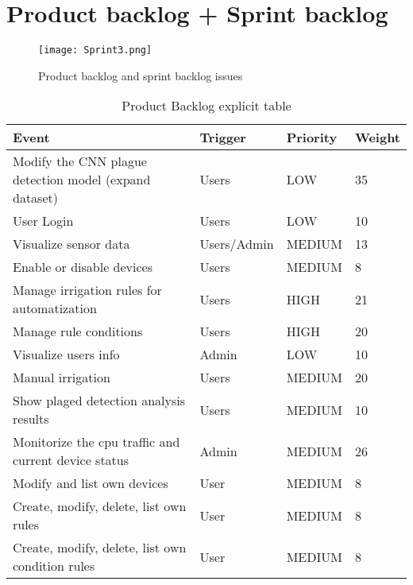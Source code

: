 \documentclass[11pt,a4paper]{article}
\begin{document}
\section{Product backlog + Sprint backlog}
\begin{figure}[hbtp]
\centering
\texttt{[image: Sprint3.png]}
\caption{Product backlog and sprint backlog issues}
\end{figure}
\newpage
\begin{table}[htbp]
\begin{tabular}{|l|l|l|l|} 
\hline
Event                                                & Trigger     & Priority & Weight \\ \hline \hline
Modify the CNN plague detection model (expand dataset) & Users       & LOW     & 35  \\ \hline
User Login                                             & Users       & LOW   & 10  \\ \hline              
Visualize sensor data                                & Users/Admin & MEDIUM   & 13     \\ \hline
Enable or disable devices                            & Users       & MEDIUM   & 8      \\ \hline
Manage irrigation rules for automatization           & Users       & HIGH   & 21      \\ \hline
Manage rule conditions                               & Users       & HIGH   & 20     \\ \hline
Visualize users info                                 & Admin       & LOW      & 10     \\ \hline
Manual irrigation                                    & Users       & MEDIUM   & 20     \\ \hline
Show plaged detection analysis results               & Users       & MEDIUM   & 10     \\ \hline
Monitorize the cpu traffic and current device status & Admin       & MEDIUM   & 26     \\ \hline
Modify and list own devices                          & User        & MEDIUM   & 8      \\ \hline
Create, modify, delete, list own rules               & User        & MEDIUM   & 8      \\ \hline
Create, modify, delete, list own condition rules     & User        & MEDIUM   & 8      \\ \hline
\end{tabular}
\caption{Product Backlog explicit table}
\end{table}
\end{document}
